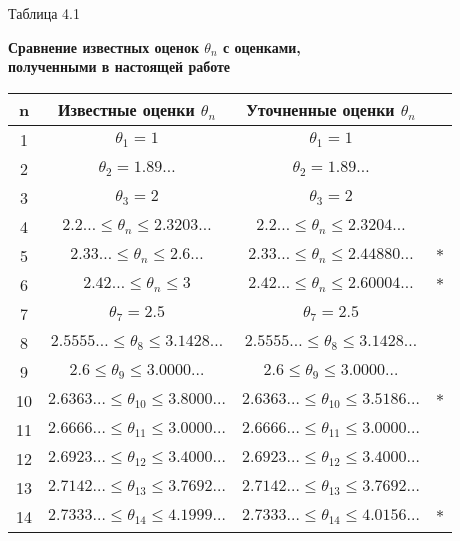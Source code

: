 \documentclass[12pt, a4paper]{extarticle}
\begin{document}
\begin{flushright}
	Таблица 4.1
\end{flushright}
\begin{center}
{\bf Сравнение известных оценок $\theta_n$ с оценками, \\ полученными в настоящей работе}
\end{center}
\begin{center}
	\begin{tabular}{|c|c|c|c|} \hline
		n& Известные оценки $\theta_n$ & Уточненные оценки $\theta_n$  & \\ \hline
		1 & $\theta_1 = 1$ & $\theta_1 = 1$ & \\ \hline
		2 & $\theta_2 = 1.89\ldots$ & $\theta_2 = 1.89\ldots$ & \\ \hline
		3 & $\theta_3 = 2$ & $\theta_3 = 2$ & \\ \hline
		4 & $2.2\ldots \leqslant\theta_n\leqslant2.3203\ldots$ & $2.2\ldots \leqslant\theta_n\leqslant2.3204\ldots$ & \\ \hline
		5 & $2.33\ldots \leqslant\theta_n\leqslant2.6\ldots$& $2.33\ldots \leqslant\theta_n\leqslant2.44880\ldots $ & $*$ \\\hline
		6 & $2.42\ldots \leqslant\theta_n\leqslant3$ & $2.42\ldots \leqslant\theta_n\leqslant2.60004\ldots$  &  $*$ \\ \hline
		7 & $\theta_7 = 2.5$& $\theta_7 = 2.5$  & \\ \hline
		8 & $2.5555\ldots\leqslant\theta_8\leqslant3.1428\dots$ &  $2.5555\ldots\leqslant\theta_8\leqslant3.1428\dots$  &  \\ \hline
		9 &$2.6\leqslant\theta_9\leqslant3.0000\ldots$ & $2.6\leqslant\theta_9\leqslant3.0000\ldots$ & \\ \hline
		10 &$2.6363\ldots\leqslant\theta_{10}\leqslant3.8000\dots$ &$2.6363\ldots\leqslant\theta_{10}\leqslant3.5186\dots$ &  $*$  \\ \hline
		11 &$2.6666\ldots\leqslant\theta_{11}\leqslant3.0000\dots$ &$2.6666\ldots\leqslant\theta_{11}\leqslant3.0000\dots$   & \\ \hline
		12 & $2.6923\ldots\leqslant\theta_{12}\leqslant3.4000\dots$& $2.6923\ldots\leqslant\theta_{12}\leqslant3.4000\dots$  & \\ \hline
		13 & $2.7142\ldots\leqslant\theta_{13}\leqslant3.7692\dots$ &$2.7142\ldots\leqslant\theta_{13}\leqslant3.7692\dots$  & \\ \hline
		14 &$2.7333\ldots\leqslant\theta_{14}\leqslant4.1999\dots$ & $2.7333\ldots\leqslant\theta_{14}\leqslant4.0156\dots$ &  $*$ \\ \hline

\end{tabular}
\end{center}
\end{document}
